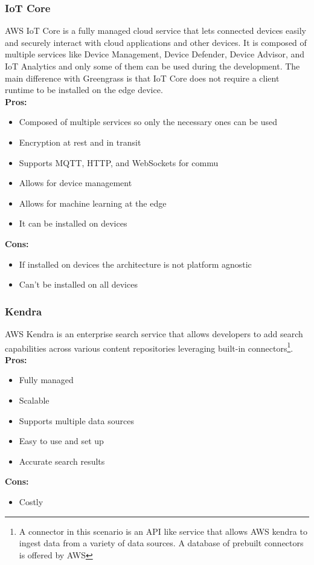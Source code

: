         \subsubsection{IoT Core}
        \label{aws:iot-core}
 AWS IoT Core is a fully managed cloud service that lets connected devices easily and securely interact with cloud applications and other devices.
 It is composed of multiple services like Device Management, Device Defender, Device Advisor, and IoT Analytics and only some of them can be used during the development. The main difference with Greengrass is that IoT Core does not require a client runtime to be installed on the edge device.\\
        \textbf{Pros:}
        \begin{itemize}
            \item Composed of multiple services so only the necessary ones can be used
            \item Encryption at rest and in transit
            \item Supports MQTT, HTTP, and WebSockets for commu
            \item Allows for device management
            \item Allows for machine learning at the edge
            \item It can be installed on devices
        \end{itemize}
        \textbf{Cons:}
        \begin{itemize}
            \item If installed on devices the architecture is not platform agnostic
            \item Can't be installed on all devices
        \end{itemize}       

        \subsubsection{Kendra}
        \label{aws:kendra}
 AWS Kendra is an enterprise search service that allows developers to add search capabilities across various content repositories leveraging built-in connectors\footnote{A connector in this scenario is an API like service that allows AWS kendra to ingest data from a variety of data sources. A database of prebuilt connectors is offered by AWS}.\\
        \textbf{Pros:}
        \begin{itemize}
            \item Fully managed
            \item Scalable
            \item Supports multiple data sources
            \item Easy to use and set up
            \item Accurate search results
        \end{itemize}
        \textbf{Cons:}
        \begin{itemize}
            \item Costly
        \end{itemize}

